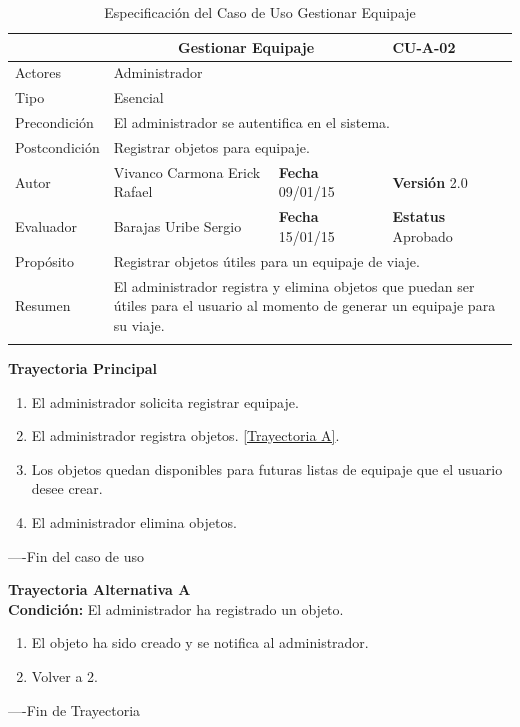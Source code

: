 \begin{longtable}{|p{2.5cm}|p{6.4cm}|p{2cm}|p{2cm}|}
	\hline
		\rowcolor[RGB]{51,153,255}{Caso de Uso}&\multicolumn{2}{c}{Gestionar Equipaje}&{\textbf{CU-A-02}}\\
	\hline
		{Actores}&\multicolumn{3}{p{11.2cm}|}{Administrador}\\
	\hline
		{Tipo}&\multicolumn{3}{p{11.2cm}|}{Esencial}\\
	\hline
		{Precondición}&\multicolumn{3}{p{11.2cm}|}{El administrador se autentifica en el sistema.}\\
	\hline
		{Postcondición}&\multicolumn{3}{p{11.2cm}|}{Registrar objetos para equipaje.}\\
	\hline
		{Autor}&{Vivanco Carmona Erick Rafael}&{\textbf{Fecha} 09/01/15}&{\textbf{Versión} 2.0}\\
			\hline
		{Evaluador}&{Barajas Uribe Sergio}&{\textbf{Fecha} 15/01/15}&{\textbf{Estatus} Aprobado}\\
	\hline
		{Propósito}&\multicolumn{3}{p{11.2cm}|}{Registrar objetos útiles para un equipaje de viaje.}\\
	\hline
		{Resumen}&\multicolumn{3}{p{11.2cm}|}{El administrador registra y elimina objetos que puedan ser útiles para el usuario al momento de generar un equipaje para su viaje.}\\	
	\hline
	\caption[Especificación del Caso de Uso Gestionar Equipaje]{Especificación del Caso de Uso Gestionar Equipaje}
    	\label{tab:cuGestionarEquipaje}
\end{longtable}

\begin{flushleft}
	\textbf{Trayectoria Principal}\\
	\begin{enumerate}
		\item El administrador solicita registrar equipaje.
		\item El administrador registra objetos. \hyperlink{TrayectoriaA_CU-A-02}{[Trayectoria A]}.
		\item Los objetos quedan disponibles para futuras listas de equipaje que el usuario desee crear.
		\item El administrador elimina objetos.
	\end{enumerate}
\end{flushleft}
----Fin del caso de uso

\begin{flushleft}
	\hypertarget{TrayectoriaA_CU-A-02}{}
	\textbf{Trayectoria Alternativa A}\\
	\textbf{Condición:} El administrador ha registrado un objeto. \\
	\begin{enumerate}
		\item El objeto ha sido creado y se notifica al administrador. 
		\item Volver a 2.
	\end{enumerate}
\end{flushleft}
----Fin de Trayectoria

